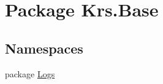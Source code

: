 \hypertarget{namespace_krs_1_1_base}{\section{Package Krs.\-Base}
\label{namespace_krs_1_1_base}
}
\subsection*{Namespaces}
\begin{DoxyCompactItemize}
\item 
package \hyperlink{namespace_krs_1_1_base_1_1_logs}{Logs}
\end{DoxyCompactItemize}
